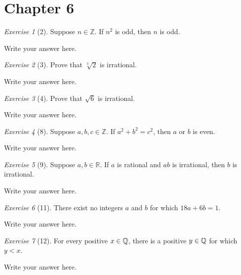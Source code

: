 \documentclass[12pt]{amsart}
\makeatletter
\theoremstyle{remark}
\newtheorem*{exercise}{Exercise}%
\def\RR{\ensuremath{\mathbb R}}
\def\ZZ{\ensuremath{\mathbb Z}}
\def\QQ{{\ensuremath\mathbb Q}}
\renewenvironment{proof}[1][\proofname]{\par\doublespacing
  \pushQED{\qed}%
  \normalfont \topsep6\p@\@plus6\p@\relax
  \list{}{%
    \settowidth{\leftmargin}{\itshape\proofname:\hskip\labelsep}%
    \setlength{\labelwidth}{0pt}%
    \setlength{\itemindent}{-\leftmargin}%
  }%
  \item[\hskip\labelsep\itshape#1\@addpunct{:}]\ignorespaces
}{%
  \popQED\endlist\@endpefalse
  \singlespacing
}
\theoremstyle{mycomment}
\makeatother
\begin{document}
\thispagestyle{fancy}

\section*{Chapter 6}
\begin{exercise}[2] Suppose $n\in\ZZ$. If $n^{2}$ is odd, then $n$ is odd.
\begin{proof}
Write your answer here.
\end{proof}
\end{exercise}

\begin{exercise}[3] Prove that $\sqrt[3]{2}$ is irrational.
\begin{proof}
Write your answer here.
\end{proof}
\end{exercise}

\begin{exercise}[4] Prove that $\sqrt{6}$ is irrational.
\begin{proof}
Write your answer here.
\end{proof}
\end{exercise}

\begin{exercise}[8] Suppose $a,b,c\in\ZZ$. If $a^{2}+b^{2}=c^{2}$, then $a$ or $b$ is even.
\begin{proof}
Write your answer here.
\end{proof}
\end{exercise}

\begin{exercise}[9] Suppose $a,b\in\RR$. If $a$ is rational and $ab$ is irrational, then $b$ is irrational.
\begin{proof}
Write your answer here.
\end{proof}
\end{exercise}

\begin{exercise}[11] There exist no integers $a$ and $b$ for which $18a+6b=1$.
\begin{proof}
Write your answer here.
\end{proof}
\end{exercise}

\begin{exercise}[12] For every positive $x\in\QQ$, there is a positive $y\in\QQ$ for which $y<x$.
\begin{proof}
Write your answer here.
\end{proof}
\end{exercise}
\end{document}
